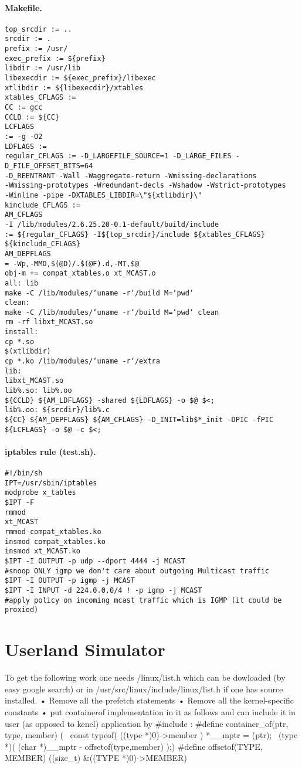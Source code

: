 \subsubsection{Makefile.}
\begin{verbatim}
top_srcdir := ..
srcdir := .
prefix := /usr/
exec_prefix := ${prefix}
libdir := /usr/lib
libexecdir := ${exec_prefix}/libexec
xtlibdir := ${libexecdir}/xtables
xtables_CFLAGS :=
CC := gcc
CCLD := ${CC}
LCFLAGS
:= -g -O2
LDFLAGS :=
regular_CFLAGS := -D_LARGEFILE_SOURCE=1 -D_LARGE_FILES -D_FILE_OFFSET_BITS=64
-D_REENTRANT -Wall -Waggregate-return -Wmissing-declarations
-Wmissing-prototypes -Wredundant-decls -Wshadow -Wstrict-prototypes
-Winline -pipe -DXTABLES_LIBDIR=\"${xtlibdir}\"
kinclude_CFLAGS :=
AM_CFLAGS
-I /lib/modules/2.6.25.20-0.1-default/build/include
:= ${regular_CFLAGS} -I${top_srcdir}/include ${xtables_CFLAGS}
${kinclude_CFLAGS}
AM_DEPFLAGS
= -Wp,-MMD,$(@D)/.$(@F).d,-MT,$@
obj-m += compat_xtables.o xt_MCAST.o
all: lib
make -C /lib/modules/‘uname -r‘/build M=‘pwd‘
clean:
make -C /lib/modules/‘uname -r‘/build M=‘pwd‘ clean
rm -rf libxt_MCAST.so
install:
cp *.so
$(xtlibdir)
cp *.ko /lib/modules/‘uname -r‘/extra
lib:
libxt_MCAST.so
lib%.so: lib%.oo
${CCLD} ${AM_LDFLAGS} -shared ${LDFLAGS} -o $@ $<;
lib%.oo: ${srcdir}/lib%.c
${CC} ${AM_DEPFLAGS} ${AM_CFLAGS} -D_INIT=lib$*_init -DPIC -fPIC
${LCFLAGS} -o $@ -c $<;
\end{verbatim}
\subsubsection{iptables rule (test.sh).}
\begin{verbatim}
#!/bin/sh
IPT=/usr/sbin/iptables
modprobe x_tables
$IPT -F
rmmod
xt_MCAST
rmmod compat_xtables.ko
insmod compat_xtables.ko
insmod xt_MCAST.ko
$IPT -I OUTPUT -p udp --dport 4444 -j MCAST
#snoop ONLY igmp we don't care about outgoing Multicast traffic
$IPT -I OUTPUT -p igmp -j MCAST
$IPT -I INPUT -d 224.0.0.0/4 ! -p igmp -j MCAST
#apply policy on incoming mcast traffic which is IGMP (it could be proxied)
\end{verbatim} 
\chapter{Userland Simulator}
To get the following work one needs /linux/list.h which can be dowloaded
(by easy google search) or in /usr/src/linux/include/linux/list.h if one has source
installed.
• Remove all the prefetch statements
• Remove all the kernel-specific constants
• put containerof implementation in it as follows and can include it in user
(as opposed to kenel) application by #include :
#define container_of(ptr, type, member) ({ \
const typeof( ((type *)0)->member ) *__mptr = (ptr);
\
(type *)( (char *)__mptr - offsetof(type,member) );})
#define offsetof(TYPE, MEMBER) ((size_t) &((TYPE *)0)->MEMBER)
